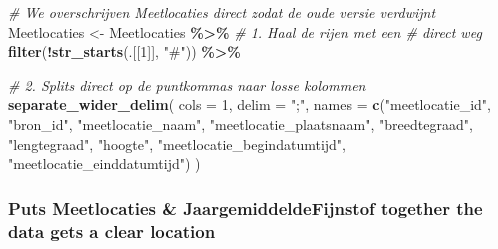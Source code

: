 \documentclass[
]{article}
\newenvironment{Shaded}{\begin{snugshade}}{\end{snugshade}}
\newcommand{\AttributeTok}[1]{\textcolor[rgb]{0.13,0.29,0.53}{#1}}
\newcommand{\CommentTok}[1]{\textcolor[rgb]{0.56,0.35,0.01}{\textit{#1}}}
\newcommand{\DecValTok}[1]{\textcolor[rgb]{0.00,0.00,0.81}{#1}}
\newcommand{\FunctionTok}[1]{\textcolor[rgb]{0.13,0.29,0.53}{\textbf{#1}}}
\newcommand{\NormalTok}[1]{#1}
\newcommand{\OtherTok}[1]{\textcolor[rgb]{0.56,0.35,0.01}{#1}}
\newcommand{\SpecialCharTok}[1]{\textcolor[rgb]{0.81,0.36,0.00}{\textbf{#1}}}
\newcommand{\StringTok}[1]{\textcolor[rgb]{0.31,0.60,0.02}{#1}}
\begin{document}
\begin{Shaded}
\begin{Highlighting}[]
\CommentTok{\# We overschrijven \textquotesingle{}Meetlocaties\textquotesingle{} direct zodat de oude versie verdwijnt}
\NormalTok{Meetlocaties }\OtherTok{\textless{}{-}}\NormalTok{ Meetlocaties }\SpecialCharTok{\%\textgreater{}\%}
  \CommentTok{\# 1. Haal de rijen met een \textquotesingle{}\#\textquotesingle{} direct weg}
  \FunctionTok{filter}\NormalTok{(}\SpecialCharTok{!}\FunctionTok{str\_starts}\NormalTok{(.[[}\DecValTok{1}\NormalTok{]], }\StringTok{"\#"}\NormalTok{)) }\SpecialCharTok{\%\textgreater{}\%}
  
  \CommentTok{\# 2. Splits direct op de puntkomma\textquotesingle{}s naar losse kolommen}
  \FunctionTok{separate\_wider\_delim}\NormalTok{(}
    \AttributeTok{cols =} \DecValTok{1}\NormalTok{, }
    \AttributeTok{delim =} \StringTok{";"}\NormalTok{, }
    \AttributeTok{names =} \FunctionTok{c}\NormalTok{(}\StringTok{"meetlocatie\_id"}\NormalTok{, }\StringTok{"bron\_id"}\NormalTok{, }\StringTok{"meetlocatie\_naam"}\NormalTok{, }
              \StringTok{"meetlocatie\_plaatsnaam"}\NormalTok{, }\StringTok{"breedtegraad"}\NormalTok{, }\StringTok{"lengtegraad"}\NormalTok{, }
              \StringTok{"hoogte"}\NormalTok{, }\StringTok{"meetlocatie\_begindatumtijd"}\NormalTok{, }\StringTok{"meetlocatie\_einddatumtijd"}\NormalTok{)}
\NormalTok{  )}
\end{Highlighting}
\end{Shaded}

\subsubsection{Puts Meetlocaties \& JaargemiddeldeFijnstof together the
data gets a clear
location}\label{puts-meetlocaties-jaargemiddeldefijnstof-together-the-data-gets-a-clear-location}
\end{document}
